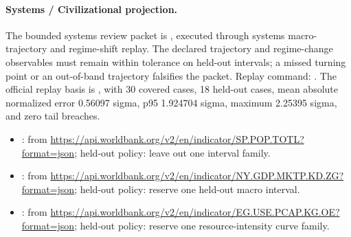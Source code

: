 \paragraph{Systems / Civilizational projection.}
The bounded systems review packet is
, executed through
systems macro-trajectory and regime-shift replay. The
declared trajectory and regime-change observables must remain within tolerance
on held-out intervals; a missed turning point or an out-of-band trajectory
falsifies the packet. Replay command:
.
The official replay basis is , with 30
covered cases, 18 held-out cases, mean absolute normalized error 0.56097
sigma, p95 1.924704 sigma, maximum 2.25395 sigma, and zero tail breaches.
\begin{itemize}[leftmargin=1.5em,nosep]
\item {}:  from \url{https://api.worldbank.org/v2/en/indicator/SP.POP.TOTL?format=json}; held-out policy: leave out one interval family.
\item {}:  from \url{https://api.worldbank.org/v2/en/indicator/NY.GDP.MKTP.KD.ZG?format=json}; held-out policy: reserve one held-out macro interval.
\item {}:  from \url{https://api.worldbank.org/v2/en/indicator/EG.USE.PCAP.KG.OE?format=json}; held-out policy: reserve one resource-intensity curve family.
\end{itemize}

\endgroup
